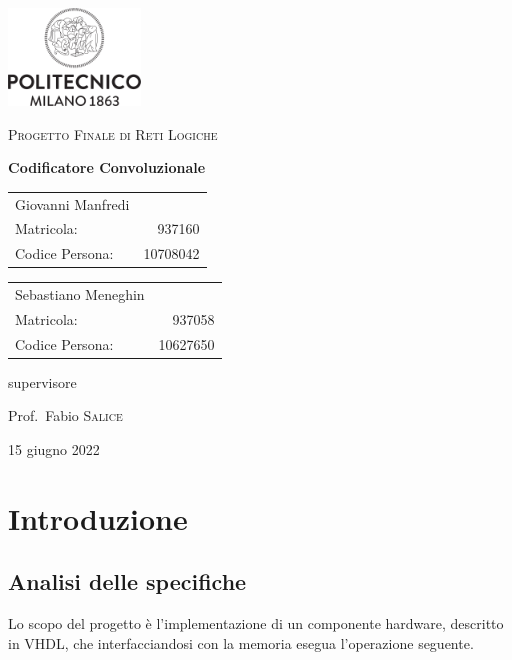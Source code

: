 \documentclass[12pt]{article} %
\begin{document}
	\begin{titlepage}
		\centering
		\includegraphics[width=100pt]{Logo_Politecnico_Milano}\par
		\vspace{1cm}
		{\scshape\Large Progetto Finale di Reti Logiche \par}
		\vspace{1.5cm}
		{\huge\bfseries Codificatore Convoluzionale\par}
		\vspace{2cm}
		\begin{multicols}{2}
			\begin{tabular}{l r}
				Giovanni Manfredi\\
				Matricola: & 937160\\ 
				Codice Persona: & 10708042
			\end{tabular}
			\begin{tabular}{l r}
				Sebastiano Meneghin\\
				Matricola: & 937058\\ 
				Codice Persona: & 10627650
			\end{tabular}
		\end{multicols}
		\vspace{6.5cm}
		supervisore\par
		Prof.\ Fabio \textsc{Salice}
		\vfill
		{\large 15 giugno 2022 \par}
	\end{titlepage}
	\tableofcontents
	\newpage
	\section{Introduzione}
	\label{sec:Introduzione}
		\subsection{Analisi delle specifiche}
			Lo scopo del progetto è l'implementazione di un componente hardware, 
			descritto in VHDL, che interfacciandosi con la memoria esegua l'operazione seguente. 
			
\end{document}
